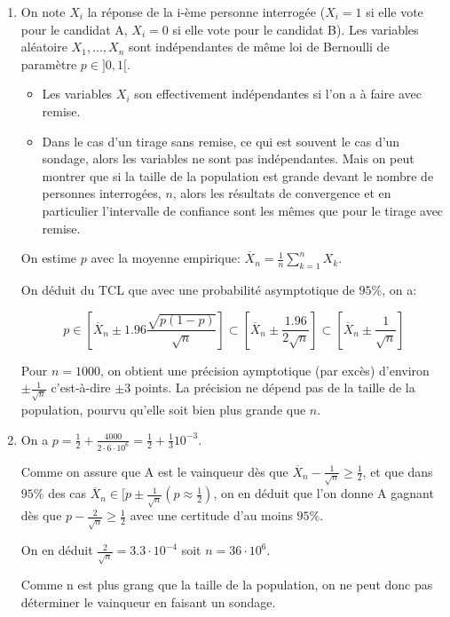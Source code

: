 \documentclass[10pt,a4paper,oneside]{article}
\newenvironment{solution}[1][Solution]{\begin{trivlist}
\item[\hskip \labelsep {\bfseries #1}]}{\end{trivlist}}
\begin{document}
\begin{solution}

\begin{enumerate}
\item
On note $X_i$ la réponse de la i-ème personne interrogée ($X_i=1$ si elle vote pour le candidat A, $X_i=0$ si elle vote pour le candidat B). Les variables aléatoire $X_1,\ldots,X_n$ sont indépendantes de même loi de Bernoulli de paramètre $p \in ]0,1[$.

\begin{itemize}
\item
Les variables $X_i$ son effectivement indépendantes si l'on a à faire avec remise.

\item
Dans le cas d'un tirage sans remise, ce qui est souvent le cas d'un sondage, alors les variables ne sont pas indépendantes. Mais on peut montrer que si la taille de la population est grande devant le nombre de personnes interrogées, $n$, alors les résultats de convergence et en particulier l'intervalle de confiance sont les mêmes que pour le tirage avec remise.

\end{itemize}

On estime $p$ avec la moyenne empirique: $\overline{X}_n = \frac{1}{n} \sum_{k = 1}^n X_k$.

On déduit du TCL que avec une probabilité asymptotique de $95\%$, on a:

\[ p \in [\overline{X}_n \pm 1.96\frac{\sqrt{p(1-p)}}{\sqrt{n}}] \subset [\overline{X}_n \pm \frac{1.96}{2\sqrt{n}}] \subset [\overline{X}_n \pm \frac{1}{\sqrt{n}}] \]

Pour $n = 1000$, on obtient une précision aymptotique (par excès) d'environ $\pm \frac{1}{\sqrt{n}}$ c'est-à-dire $\pm 3$ points. La précision ne dépend pas de la taille de la population, pourvu qu'elle soit bien plus grande que $n$.

\item
On a $p = \frac{1}{2} + \frac{4000}{2 \cdot 6 \cdot 10^6} = \frac{1}{2} + \frac{1}{3}10^{-3}$.

Comme on assure que A est le vainqueur dès que $\overline{X}_n - \frac{1}{\sqrt{n}} \geq \frac{1}{2}$, et que dans $95\%$ des cas $\overline{X}_n \in [p \pm \frac{1}{\sqrt{n}}(p \approx \frac{1}{2})$, on en déduit que l'on donne A gagnant dès que $p - \frac{2}{\sqrt{n}} \geq \frac{1}{2}$ avec une certitude d'au moins $95\%$.

On en déduit $\frac{2}{\sqrt{n}} = 3.3 \cdot 10^{-4}$ soit $n = 36 \cdot 10^6$.

Comme n est plus grang que la taille de la population, on ne peut donc pas déterminer le vainqueur en faisant un sondage.

\end{enumerate}

\end{solution}
\end{document}
